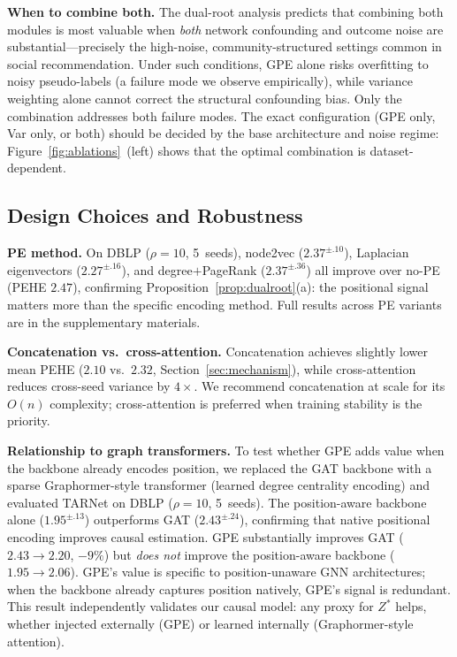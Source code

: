 \documentclass[sigconf,anonymous,review]{acmart}
\begin{document}
\textbf{When to combine both.} The dual-root analysis predicts that combining both modules is most valuable when \emph{both} network confounding and outcome noise are substantial---precisely the high-noise, community-structured settings common in social recommendation. Under such conditions, GPE alone risks overfitting to noisy pseudo-labels (a failure mode we observe empirically), while variance weighting alone cannot correct the structural confounding bias. Only the combination addresses both failure modes. The exact configuration (GPE only, Var only, or both) should be decided by the base architecture and noise regime: Figure~\ref{fig:ablations}~(left) shows that the optimal combination is dataset-dependent.

\subsection{Design Choices and Robustness}

\textbf{PE method.} On DBLP ($\rho{=}10$, 5~seeds), node2vec ($2.37^{\pm.10}$), Laplacian eigenvectors ($2.27^{\pm.16}$), and degree$+$PageRank ($2.37^{\pm.36}$) all improve over no-PE (PEHE $2.47$), confirming Proposition~\ref{prop:dualroot}(a): the positional signal matters more than the specific encoding method. Full results across PE variants are in the supplementary materials.

\textbf{Concatenation vs.\ cross-attention.} Concatenation achieves slightly lower mean PEHE ($2.10$ vs.\ $2.32$, Section~\ref{sec:mechanism}), while cross-attention reduces cross-seed variance by $4{\times}$. We recommend concatenation at scale for its $O(n)$ complexity; cross-attention is preferred when training stability is the priority.

\textbf{Relationship to graph transformers.} To test whether GPE adds value when the backbone already encodes position, we replaced the GAT backbone with a sparse Graphormer-style transformer (learned degree centrality encoding) and evaluated TARNet on DBLP ($\rho{=}10$, 5~seeds). The position-aware backbone alone ($1.95^{\pm.13}$) outperforms GAT ($2.43^{\pm.24}$), confirming that native positional encoding improves causal estimation. GPE substantially improves GAT ($2.43 \to 2.20$, $-9\%$) but \emph{does not} improve the position-aware backbone ($1.95 \to 2.06$). GPE's value is specific to position-unaware GNN architectures; when the backbone already captures position natively, GPE's signal is redundant. This result independently validates our causal model: any proxy for $Z^*$ helps, whether injected externally (GPE) or learned internally (Graphormer-style attention).
\end{document}

